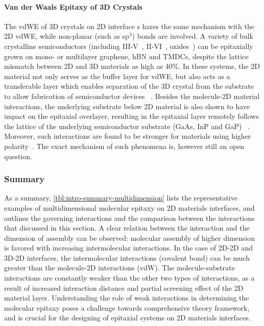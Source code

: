 \paragraph{Van der Waals Epitaxy of 3D Crystals}
\label{sec:orgeb0161b}

The vdWE of 3D crystals on 2D interface s
hares the same mechanism with the 2D
vdWE, while non-planar (such as sp\(^{\text{3}}\)) bonds are involved.
%
A variety of bulk crystalline semiconductors (including
III-V~\autocite{Alaskar_2015_GaAs_gr_Si_theor,Kim_2017_remote_epi_Gr,Nepal_2013_GaN_gr,Kim_2014_direct_vdw_GaN_gr,Makimoto_2012_InGaN_hBN},
II-VI~\autocite{Loeher_1994_vdw_epi_CdS_MoTe,Loeher_1996_CdTe_MoWTe},
oxides~\autocite{Oh_2014_ZnO_hBN,Chung_2010_GaN_ZnO_gr})
can be epitaxially grown on mono- or multilayer graphene, hBN and TMDCs, despite the lattice mismatch between 2D and 3D materials as high as 40\%.
%
In
these systems, the 2D material not only serves as the buffer layer for
vdWE, but also acts as a transferable layer which enables separation
of the 3D crystal from the substrate to allow fabrication of
semiconductor devices
~\autocite{Makimoto_2012_InGaN_hBN,Kobayashi_2012_GaN_hBN,Kim_2014_direct_vdw_GaN_gr,Kim_2017_remote_epi_Gr}.
%
Besides the molecule-2D material interactions, the underlying
substrate below 2D material is also shown to have impact on the
epitaxial overlayer, resulting in the epitaxial layer remotely follows
the lattice of the underlying semiconductor substrate (GaAs, InP and
GaP) ~\autocite{Kim_2017_remote_epi_Gr}. Moreover, such interactions
are found to be stronger for materials using higher
polarity~\autocite{Kong_2018_vdw_polar}.
%
The exact mechanism of such phenomena is, however still an open question.


\subsubsection{Summary}
\label{sec:org0b4290f}

As a summary, \autoref{tbl:intro-summary-multidimension} lists the
representative examples of multidimensional molecular epitaxy on 2D
materials interfaces, and outlines the governing interactions and the
comparison between the interactions that discussed in this section. A
clear relation between the interaction and the dimension of assembly
can be observed: molecular assembly of higher dimension is favored
with increasing intermolecular interactions. In the case of 2D-2D and
3D-2D interfaces, the intermolecular interactions (covalent bond) can
be much greater than the molecule-2D interactions (vdW).
%
The molecule-substrate interactions are constantly
weaker than the other two types of interactions, as a result of
increased interaction distance and partial screening effect of the 2D
material layer. Understanding the role of weak interactions in
determining the molecular epitaxy poses a challenge towards
comprehensive theory framework, and is crucial for the designing of
epitaxial systems on 2D materials interfaces.


